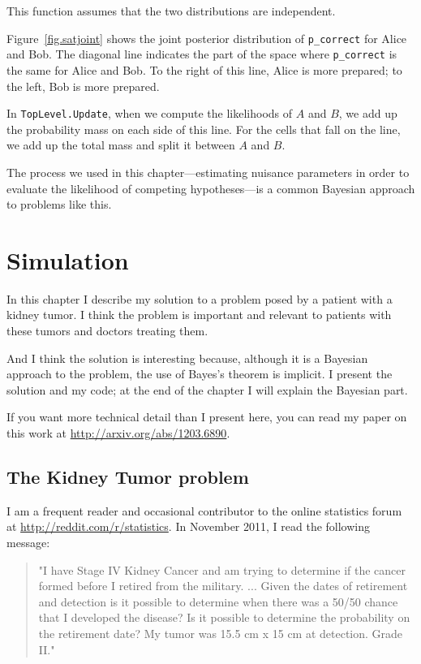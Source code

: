 \documentclass[12pt]{book}
\begin{document}
This function assumes that the two distributions are independent.

Figure~\ref{fig.satjoint} shows the joint posterior distribution of
\verb"p_correct" for Alice and Bob.  The diagonal line indicates the
part of the space where \verb"p_correct" is the same for Alice and
Bob.  To the right of this line, Alice is more prepared; to the left,
Bob is more prepared.

In {\tt TopLevel.Update}, when we compute the likelihoods of $A$ and
$B$, we add up the probability mass on each side of this line.  For the
cells that fall on the line, we add up the total mass and split it
between $A$ and $B$.

The process we used in this chapter---estimating nuisance
parameters in order to evaluate the likelihood of competing
hypotheses---is a common Bayesian approach to problems like this.




\chapter{Simulation}

In this chapter I describe my solution to a problem posed
by a patient with a kidney tumor.  I think the problem is 
important and relevant to patients with these tumors
and doctors treating them.

And I think the solution is interesting because, although it
is a Bayesian approach to the problem, the use of Bayes's theorem
is implicit.  I present the solution and my code; at the end
of the chapter I will explain the Bayesian part.

If you want more technical detail than I present here, you can
read my paper on this work at \url{http://arxiv.org/abs/1203.6890}.


\section{The Kidney Tumor problem}

I am a frequent reader and occasional contributor to the online statistics
forum at \url{http://reddit.com/r/statistics}.  In November 2011, I read
the following message:

\begin{quote}
"I have Stage IV Kidney Cancer and am trying to determine if the
  cancer formed before I retired from the military. ... Given the
  dates of retirement and detection is it possible to determine when
  there was a 50/50 chance that I developed the disease? Is it
  possible to determine the probability on the retirement date?  My
  tumor was 15.5 cm x 15 cm at detection. Grade II."
\end{quote}
\end{document}
